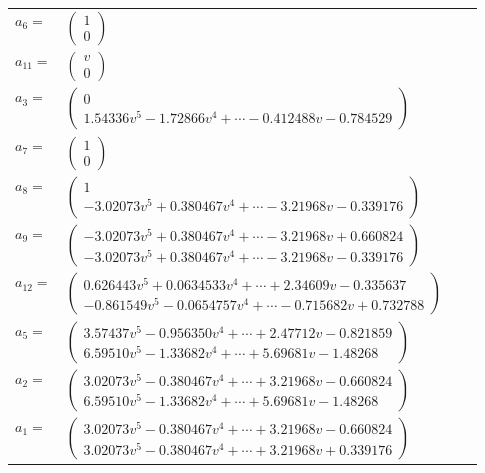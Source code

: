\documentclass[1p]{elsarticle_modified}
\theoremstyle{definition}
\begin{document}
\begin{tabular}{m{7pt} m{180pt} m{7pt} m{180pt} }
\flushright $a_{6}=$&$\begin{pmatrix}1\\0\end{pmatrix}$ \\
\flushright $a_{11}=$&$\begin{pmatrix}v\\0\end{pmatrix}$ \\
\flushright $a_{3}=$&$\begin{pmatrix}0\\1.54336 v^{5}-1.72866 v^{4}+\cdots-0.412488 v-0.784529\end{pmatrix}$ \\
\flushright $a_{7}=$&$\begin{pmatrix}1\\0\end{pmatrix}$ \\
\flushright $a_{8}=$&$\begin{pmatrix}1\\-3.02073 v^{5}+0.380467 v^{4}+\cdots-3.21968 v-0.339176\end{pmatrix}$ \\
\flushright $a_{9}=$&$\begin{pmatrix}-3.02073 v^{5}+0.380467 v^{4}+\cdots-3.21968 v+0.660824\\-3.02073 v^{5}+0.380467 v^{4}+\cdots-3.21968 v-0.339176\end{pmatrix}$ \\
\flushright $a_{12}=$&$\begin{pmatrix}0.626443 v^{5}+0.0634533 v^{4}+\cdots+2.34609 v-0.335637\\-0.861549 v^{5}-0.0654757 v^{4}+\cdots-0.715682 v+0.732788\end{pmatrix}$ \\
\flushright $a_{5}=$&$\begin{pmatrix}3.57437 v^{5}-0.956350 v^{4}+\cdots+2.47712 v-0.821859\\6.59510 v^{5}-1.33682 v^{4}+\cdots+5.69681 v-1.48268\end{pmatrix}$ \\
\flushright $a_{2}=$&$\begin{pmatrix}3.02073 v^{5}-0.380467 v^{4}+\cdots+3.21968 v-0.660824\\6.59510 v^{5}-1.33682 v^{4}+\cdots+5.69681 v-1.48268\end{pmatrix}$ \\
\flushright $a_{1}=$&$\begin{pmatrix}3.02073 v^{5}-0.380467 v^{4}+\cdots+3.21968 v-0.660824\\3.02073 v^{5}-0.380467 v^{4}+\cdots+3.21968 v+0.339176\end{pmatrix}$ \\

\end{tabular}
\end{document}
